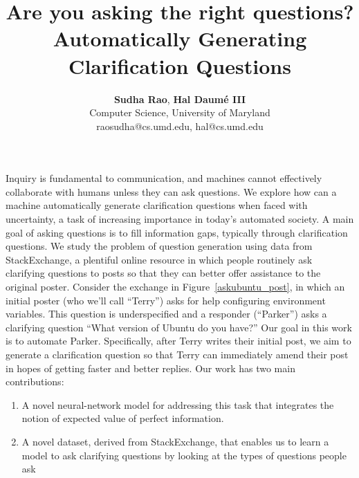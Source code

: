 \documentclass[11pt,a4paper]{article}
\title{Are you asking the right questions? \\ Automatically Generating Clarification Questions}
\author{ 
  \textbf{Sudha Rao}${}$\textnormal{,} \textbf{Hal Daum\'e III}${}$\\
  Computer Science, University of Maryland\\
  raosudha@cs.umd.edu, hal@cs.umd.edu
  }
\date{}
\begin{document}
\maketitle
Inquiry is fundamental to communication, and machines cannot effectively collaborate with humans unless they can ask questions. We explore how can a machine automatically generate clarification questions when faced with uncertainty, a task of increasing importance in today's automated society. 
A main goal of asking questions is to fill information gaps, typically through clarification questions. 
We study the problem of question generation using data from StackExchange, a plentiful online resource in which people routinely ask clarifying questions to posts so that they can better offer assistance to the original poster. Consider the exchange in Figure~\ref{askubuntu_post}, in which an initial poster (who we'll call ``Terry'') asks for help configuring environment variables.
This question is underspecified and a responder (``Parker'') asks a clarifying question ``\textsf{\small What version of Ubuntu do you have?}''
Our goal in this work is to automate Parker.
Specifically, after Terry writes their initial post, we aim to generate a clarification question so that Terry can immediately amend their post in hopes of getting faster and better replies.
%
Our work has two main contributions: 
\begin{enumerate}
	\item A novel neural-network model for addressing this task that integrates the notion of expected value of perfect information. 
	\item A novel dataset, derived from StackExchange, that enables us to learn a model to ask clarifying questions by looking at the types of questions people ask 
\end{enumerate}
\end{document}
